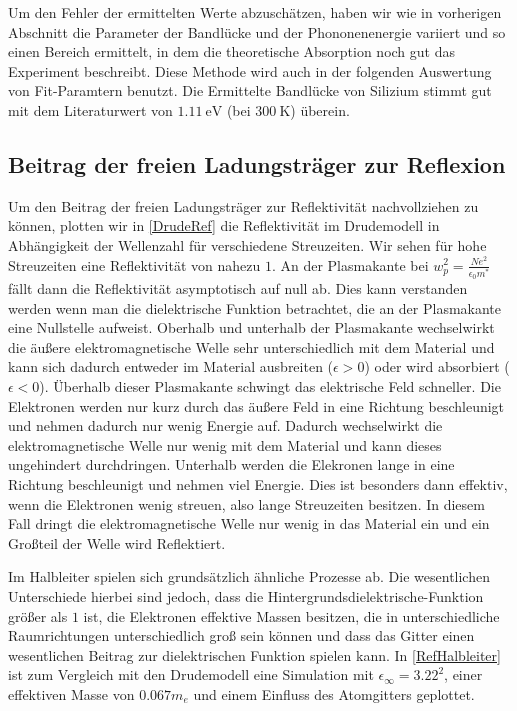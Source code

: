 \documentclass[paper=a4,fontsize=10pt,DIV=18,twocolumn,parskip=half]{scrartcl}
\numberwithin{equation}{section}    %
\begin{document}
Um den Fehler der ermittelten Werte abzuschätzen, haben wir wie in vorherigen 
Abschnitt die Parameter der Bandlücke und der Phononenenergie variiert und so 
einen Bereich ermittelt, in dem die theoretische Absorption noch gut das 
Experiment beschreibt. Diese Methode wird auch in der folgenden Auswertung von 
Fit-Paramtern benutzt. Die Ermittelte Bandlücke von Silizium stimmt gut mit dem 
Literaturwert von $\SI{1.11}{\eV}$ \cite{kittel} (bei $\SI{300}{\K}$) überein.

\subsection{Beitrag der freien Ladungsträger zur Reflexion}

Um den Beitrag der freien Ladungsträger zur Reflektivität nachvollziehen zu 
können, plotten wir in \cref{DrudeRef} die Reflektivität im Drudemodell in 
Abhängigkeit der Wellenzahl für verschiedene Streuzeiten. Wir sehen für hohe 
Streuzeiten eine Reflektivität von nahezu $1$. An der Plasmakante bei $ 
w_p^2=\frac{N e^2}{\epsilon_0 m^*}$ fällt dann die Reflektivität asymptotisch 
auf null ab. Dies kann verstanden werden  wenn man die dielektrische Funktion 
betrachtet, die an der Plasmakante eine Nullstelle aufweist. Oberhalb und 
unterhalb der Plasmakante wechselwirkt die äußere elektromagnetische Welle sehr 
unterschiedlich mit dem Material und kann sich dadurch entweder im Material 
ausbreiten ($\epsilon > 0$) oder wird absorbiert ($\epsilon < 0$). Überhalb 
dieser Plasmakante schwingt das elektrische Feld schneller. Die Elektronen 
werden nur kurz durch das äußere Feld in eine Richtung beschleunigt und nehmen 
dadurch nur wenig Energie auf. Dadurch wechselwirkt die elektromagnetische Welle
nur wenig mit dem Material und kann dieses ungehindert durchdringen. Unterhalb 
werden die Elekronen lange in eine Richtung beschleunigt und nehmen viel 
Energie. Dies ist besonders dann effektiv, wenn die Elektronen wenig streuen, 
also lange Streuzeiten besitzen. In diesem Fall dringt die elektromagnetische 
Welle nur wenig in das Material ein und ein Großteil der Welle wird Reflektiert.

Im Halbleiter spielen sich grundsätzlich ähnliche Prozesse ab. Die wesentlichen 
Unterschiede hierbei sind jedoch, dass die Hintergrundsdielektrische-Funktion 
größer als $1$ ist, die Elektronen effektive Massen besitzen, die in 
unterschiedliche Raumrichtungen unterschiedlich groß sein können und dass das 
Gitter einen wesentlichen Beitrag zur dielektrischen Funktion spielen kann. In 
\ref{RefHalbleiter} ist zum Vergleich mit den Drudemodell eine Simulation mit 
$\epsilon_\infty=3.22^2$, einer effektiven Masse von $0.067m_e$ und einem 
Einfluss des Atomgitters geplottet.
\end{document}
